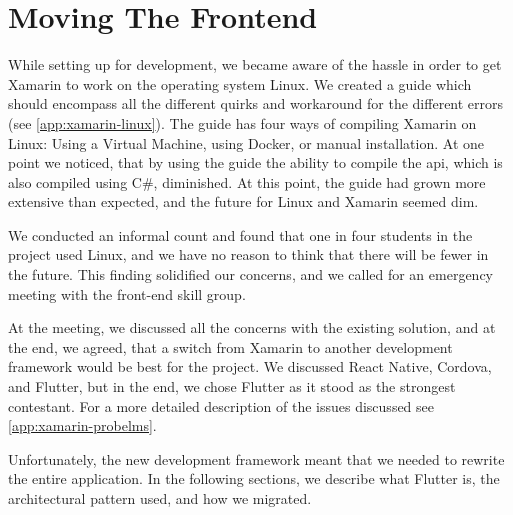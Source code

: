 \section{Moving The Frontend}\label{sec:MovingTheFrontend}

While setting up for development, we became aware of the hassle in order to get Xamarin to work on the operating system Linux. We created a guide which should encompass all the different quirks and workaround for the different errors (see \autoref{app:xamarin-linux}). The guide has four ways of compiling Xamarin on Linux: Using a Virtual Machine, using Docker, or manual installation. At one point we noticed, that by using the guide the ability to compile the \gls{api}, which is also compiled using C\#, diminished. At this point, the guide had grown more extensive than expected, and the future for Linux and Xamarin seemed dim.

We conducted an informal count and found that one in four students in the project used Linux, and we have no reason to think that there will be fewer in the future. This finding solidified our concerns, and we called for an emergency meeting with the front-end skill group.

At the meeting, we discussed all the concerns with the existing solution, and at the end, we agreed, that a switch from Xamarin to another development framework would be best for the project. We discussed React Native\cite{react-native:website}, Cordova\cite{cordova:website}, and Flutter\cite{flutter:website}, but in the end, we chose Flutter as it stood as the strongest contestant. For a more detailed description of the issues discussed see \autoref{app:xamarin-probelms}.

Unfortunately, the new development framework meant that we needed to rewrite the entire application. In the following sections, we describe what Flutter is, the architectural pattern used, and how we migrated.
